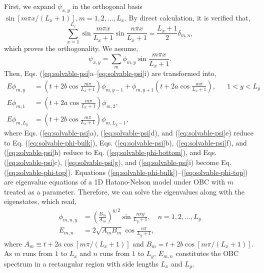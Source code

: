 \documentclass[pdflatex,sn-nature, iicol]{sn-jnl}%
\theoremstyle{thmstyleone}%
\theoremstyle{thmstyletwo}%
\theoremstyle{thmstylethree}%
\begin{document}
First, we expand $\psi_{x,y}$ in the orthogonal basis $\sin[m\pi x/(L_{x}+1)],m=1,2,\dots,L_{x}$.
By direct calculation, it is verified that, 
\begin{equation}
\sum_{x=1}^{L_{x}}\sin\frac{m\pi x}{L_{x}+1}\sin\frac{n\pi x}{L_{x}+1}=\frac{L_{x}+1}{2}\delta_{m,n},
\end{equation}
which proves the orthogonality. We assume,
\begin{equation}
\psi_{x,y}=\sum_{m}\phi_{m,y}\sin\frac{m\pi x}{L_{x}+1}.
\end{equation}
Then, Eqs. (\ref{eq:solvable-psi}a--\ref{eq:solvable-psi}i) are
transformed into, \begin{subequations}
\begin{align}
E\phi_{m,y} & =\left(t+2b\cos\frac{m\pi}{L_{x}+1}\right)\phi_{m,y-1}+\phi_{m,y+1}\left(t+2a\cos\frac{m\pi}{L_{x}+1}\right), &  & 1<y<L_{y}\label{eq:solvable-phi-bulk}\\
E\phi_{m,1} & =\left(t+2a\cos\frac{m\pi}{L_{x}+1}\right)\phi_{m,2},\label{eq:solvable-phi-bottom}\\
E\phi_{m,L_{y}} & =\left(t+2b\cos\frac{m\pi}{L_{x}+1}\right)\phi_{m,L_{y}-1},\label{eq:solvable-phi-top}
\end{align}
\end{subequations} where Eqs. (\ref{eq:solvable-psi}a), (\ref{eq:solvable-psi}d),
and (\ref{eq:solvable-psi}e) reduce to Eq. (\ref{eq:solvable-phi-bulk}),
Eqs. (\ref{eq:solvable-psi}b), (\ref{eq:solvable-psi}f), and (\ref{eq:solvable-psi}h)
reduce to Eq. (\ref{eq:solvable-phi-bottom}), and Eqs. (\ref{eq:solvable-psi}c),
(\ref{eq:solvable-psi}g), and (\ref{eq:solvable-psi}i) become Eq.
(\ref{eq:solvable-phi-top}). Equations (\ref{eq:solvable-phi-bulk})--(\ref{eq:solvable-phi-top})
are eigenvalue equations of a 1D Hatano-Nelson model under OBC with
$m$ treated as a parameter. Therefore, we can solve the eigenvalues
along with the eigenstates, which read,
\begin{align}
\phi_{m,n,y} & =\left(\frac{B_{m}}{A_{m}}\right)^{y/2}\sin\frac{n\pi y}{L_{y}+1},\quad n=1,2,\dots,L_{y}\\
E_{m,n} & =2\sqrt{A_{m}B_{m}}\cos\frac{n\pi}{L_{y}+1},\label{eq:solvable-eigenenergy}
\end{align}
where $A_{m}\equiv t+2a\cos[m\pi/(L_{x}+1)]$ and $B_{m}=t+2b\cos[m\pi/(L_{x}+1)]$.
As $m$ runs from $1$ to $L_{x}$ and $n$ runs from $1$ to $L_{y}$,
$E_{m,n}$ constitutes the OBC spectrum in a rectangular region with
side lengths $L_{x}$ and $L_{y}$. 
\end{document}
